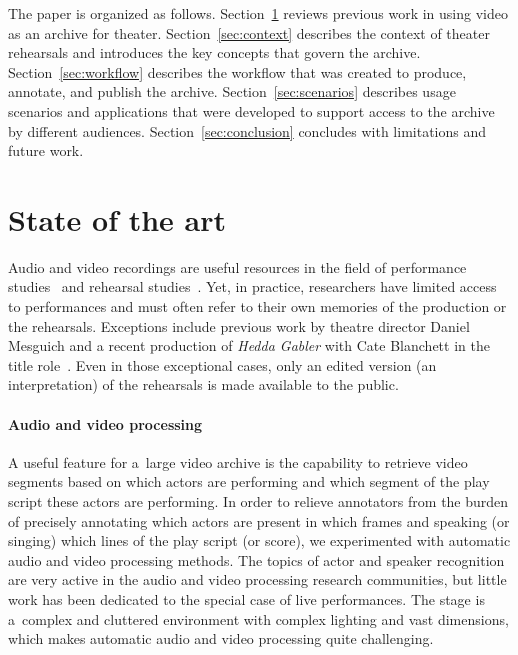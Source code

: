 \documentclass[conference]{IEEEtran}
\newcommand{\todo}[1]{\noindent\textcolor{red}{{\bf \{ToDo} #1{\bf \}}}}
\begin{document}

The paper is organized as follows. Section~\ref{sec:stateoftheart} reviews previous work in using video as an archive for theater. Section~\ref{sec:context} describes the context of theater rehearsals and introduces the key concepts that govern the archive. Section~\ref{sec:workflow} describes the workflow that was created to produce, annotate, and publish the archive. Section~\ref{sec:scenarios} describes usage scenarios and applications that were developed to support access to the archive by different audiences. Section~\ref{sec:conclusion} concludes with limitations and future work.



\section{State of the art}
\label{sec:stateoftheart}

Audio and video recordings are useful resources in the field of performance studies~\cite{mcauley1994video,Bravo07} and rehearsal studies~\cite{McAuley06,McAuley08}. Yet, in practice, researchers have limited access to performances and must often refer to their own memories of the production or the rehearsals. Exceptions include previous work by theatre director Daniel Mesguich\cite{Bouchez07}  and a recent production of \emph{Hedda Gabler} with Cate Blanchett in the title role~\cite{Darling07}. Even in those exceptional cases, only an edited version (an interpretation)  of the rehearsals is made available to the public.



\paragraph*{Audio and video processing}
A useful feature for a~large video archive is the capability to retrieve video segments based on which actors 
are performing and which segment of the play script these actors are performing. In order to relieve annotators from the burden of precisely annotating which actors are present in which frames and speaking (or singing) which lines of the play script (or score),  we experimented with automatic audio and video processing methods. The topics of actor and speaker recognition are very active in the audio and video processing research communities, but little work has been dedicated to the special case of live performances. The stage is a~complex and cluttered environment  with complex lighting and vast dimensions, which makes automatic audio and video processing quite challenging. 
\end{document}
